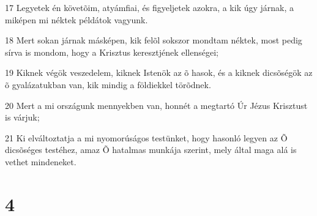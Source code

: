 \par 17 Legyetek én követõim, atyámfiai, és figyeljetek azokra, a kik úgy járnak, a miképen mi néktek példátok vagyunk.
\par 18 Mert sokan járnak másképen, kik felõl sokszor mondtam néktek, most pedig sírva is mondom, hogy a Krisztus keresztjének ellenségei;
\par 19 Kiknek végök veszedelem, kiknek Istenök az õ hasok, és a kiknek dicsõségök az õ gyalázatukban van, kik mindig a földiekkel törõdnek.
\par 20 Mert a mi országunk mennyekben van, honnét a megtartó Úr Jézus Krisztust is várjuk;
\par 21 Ki elváltoztatja a mi nyomorúságos testünket, hogy hasonló legyen az Õ dicsõséges testéhez, amaz Õ hatalmas munkája szerint, mely által maga alá is vethet mindeneket.

\chapter{4}

